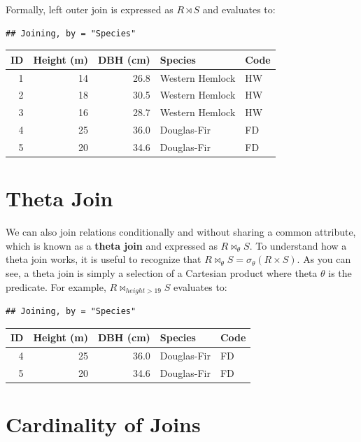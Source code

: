 \documentclass[
]{book}
\begin{document}
Formally, left outer join is expressed as \(R⋊S\) and evaluates to:

\begin{verbatim}
## Joining, by = "Species"
\end{verbatim}

\begin{tabular}{rrrll}
\toprule
ID & Height (m) & DBH (cm) & Species & Code\\
\midrule
1 & 14 & 26.8 & Western Hemlock & HW\\
2 & 18 & 30.5 & Western Hemlock & HW\\
3 & 16 & 28.7 & Western Hemlock & HW\\
4 & 25 & 36.0 & Douglas-Fir & FD\\
5 & 20 & 34.6 & Douglas-Fir & FD\\
\bottomrule
\end{tabular}

\hypertarget{theta-join}{%
\section{Theta Join}\label{theta-join}}

We can also join relations conditionally and without sharing a common attribute, which is known as a \textbf{theta join} and expressed as \(R⋈_θS\). To understand how a theta join works, it is useful to recognize that \(R⋈_θS=σ_{θ}(R×S)\). As you can see, a theta join is simply a selection of a Cartesian product where theta \(θ\) is the predicate. For example, \(R⋈_{height>19}S\) evaluates to:

\begin{verbatim}
## Joining, by = "Species"
\end{verbatim}

\begin{tabular}{rrrll}
\toprule
ID & Height (m) & DBH (cm) & Species & Code\\
\midrule
4 & 25 & 36.0 & Douglas-Fir & FD\\
5 & 20 & 34.6 & Douglas-Fir & FD\\
\bottomrule
\end{tabular}

\hypertarget{cardinality-of-joins}{%
\section{Cardinality of Joins}\label{cardinality-of-joins}}
\end{document}
